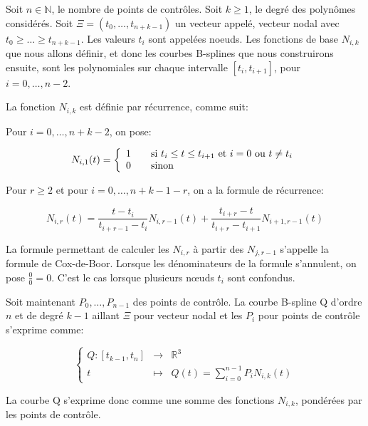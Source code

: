 \begin{mydef}\label{def:chap1_coxdeboor}
  Soit $n \in \mathbb{N}$, le nombre de points de contrôles. Soit $k
  \geq 1$, le degré des polynômes considérés. Soit $\Xi = (t_0, \dotsc,
  t_{n+k-1})$ un vecteur appelé, vecteur nodal avec $t_0 \geq \dotsc
  \geq t_{n+k-1}$. Les valeurs $t_i$ sont appelées noeuds. Les
  fonctions de base $N_{i,k}$ que nous allons définir, et donc les
  courbes B-splines que nous construirons ensuite, sont les
  polynomiales sur chaque intervalle $[t_i,t_{i+1}]$, pour $i =
  0,\dotsc,n-2$.

  La fonction $N_{i,k}$ est définie par récurrence,
  comme suit:

  Pour $i = 0, \dotsc, n+k-2$, on pose:

  \begin{equation}
    N_{i,1}(t) = \left\{
  \begin{array}{l l}
    1 & \quad \text{si $t_i \leq t \leq t_{i+1}$ et $i = 0$ ou $t \neq t_i$} \\
    0 & \quad \text{sinon} \\
  \end{array} \right.
  \end{equation}

  Pour $r \geq 2$ et pour $i = 0, \dotsc, n + k - 1 - r$, on a la
  formule de récurrence:

  \begin{equation}
    N_{i,r}(t) = \frac{t - t_i}{t_{i+r-1}-t_i} N_{i,r-1}(t) +
    \frac{t_{i+r} - t}{t_{i+r} - t_{i+1}} N_{i+1,r-1}(t)
  \end{equation}

  La formule permettant de calculer les $N_{i,r}$ à partir des
  $N_{j,r-1}$ s'appelle la formule de Cox-de-Boor. Lorsque les dénominateurs de la formule s'annulent,
  on pose $\frac{0}{0} = 0$. C'est le cas lorsque plusieurs n\oe uds
  $t_i$ sont confondus.

\end{mydef}

\begin{mydef}\label{def:chap1_spline}
  Soit maintenant $P_0, \dotsc, P_{n-1}$ des points de contrôle. La
  courbe B-spline Q d'ordre $n$ et de degré $k - 1$ aillant $\Xi$ pour
  vecteur nodal et les $P_i$ pour points de contrôle s'exprime comme:

  \begin{equation}
    \left\{
    \begin{array}{ccc}
      Q : [t_{k-1},t_n] & \rightarrow & \mathbb{R}^3\\
      t & \mapsto & Q(t) = \sum_{i=0}^{n-1} P_i N_{i,k}(t)
    \end{array}
    \right.
  \end{equation}

  La courbe Q s'exprime donc comme une somme des fonctions $N_{i,k}$,
  pondérées par les points de contrôle.
\end{mydef}


